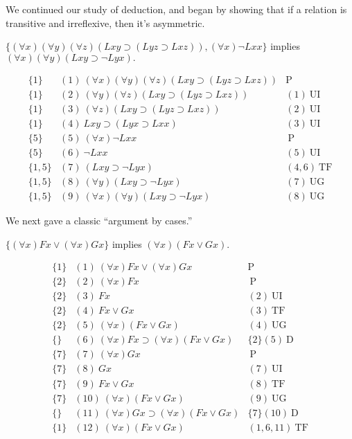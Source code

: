 We continued our study of deduction, and began by showing that if a relation is transitive and irreflexive, then it's asymmetric.
\begin{center}
$\{(\forall x)(\forall y)(\forall z)(Lxy\supset(Lyz\supset Lxz)), (\forall x)\neg Lxx\}$ implies $(\forall x)(\forall y)(Lxy\supset\neg Lyx).$
\end{center}
\[
\begin{array}{lll}
\{1\}   & (1)\  (\forall x)(\forall y)(\forall z)(Lxy\supset(Lyz\supset Lxz)) &  \mathrm{P}\\
\{1\}   & (2)\ (\forall y)(\forall z)(Lxy\supset(Lyz\supset Lxz)) & (1) \ \mathrm{UI}\\
\{1\}   & (3)\ (\forall z)(Lxy\supset(Lyz\supset Lxz)) &  (2)\ \mathrm{UI}\\
\{1\}   & (4)\ Lxy\supset(Lyx\supset Lxx)   & (3)\ \mathrm{UI}\\
\{5\}   & (5)\ (\forall x) \neg Lxx  & \ \mathrm{P}\\
\{5\}   & (6)\ \neg Lxx  & (5)\ \mathrm{UI}\\
\{1,5\}   & (7)\ (Lxy\supset\neg Lyx)  & (4,6)\ \mathrm{TF}\\
\{1,5\}   & (8)\ (\forall y)(Lxy\supset\neg Lyx)  & (7)\ \mathrm{UG}\\
\{1,5\}   & (9)\ (\forall x)(\forall y)(Lxy\supset\neg Lyx)  & (8)\ \mathrm{UG}
\end{array}
\]

We next gave a classic ``argument by cases.''
\begin{center}
$\{(\forall x)Fx\vee(\forall x)Gx\}$ implies $(\forall x)(Fx\vee Gx).$
\end{center}
\[
\begin{array}{lll}
\{1\}   & (1)\  (\forall x)Fx\vee(\forall x)Gx &  \mathrm{P}\\
\{2\}   & (2)\ (\forall x)Fx &  \ \mathrm{P}\\
\{2\}   & (3)\ Fx &  (2)\ \mathrm{UI}\\
\{2\}   & (4)\ Fx\vee Gx   & (3)\ \mathrm{TF}\\
\{2\}   & (5)\ (\forall x) (Fx\vee Gx)  & (4)\ \mathrm{UG}\\
\{\}   & (6)\ (\forall x)Fx\supset(\forall x) (Fx\vee Gx)   & \{2\}(5)\ \mathrm{D}\\
\{7\}   & (7)\ (\forall x)Gx &  \ \mathrm{P}\\
\{7\}   & (8)\ Gx &  (7)\ \mathrm{UI}\\
\{7\}   & (9)\ Fx\vee Gx   & (8)\ \mathrm{TF}\\
\{7\}   & (10)\ (\forall x) (Fx\vee Gx)  & (9)\ \mathrm{UG}\\
\{\}   & (11)\ (\forall x)Gx\supset(\forall x) (Fx\vee Gx)   & \{7\}(10)\ \mathrm{D}\\
\{1\}   & (12)\ (\forall x) (Fx\vee Gx)  & (1,6,11)\ \mathrm{TF}\\
\end{array}
\]

